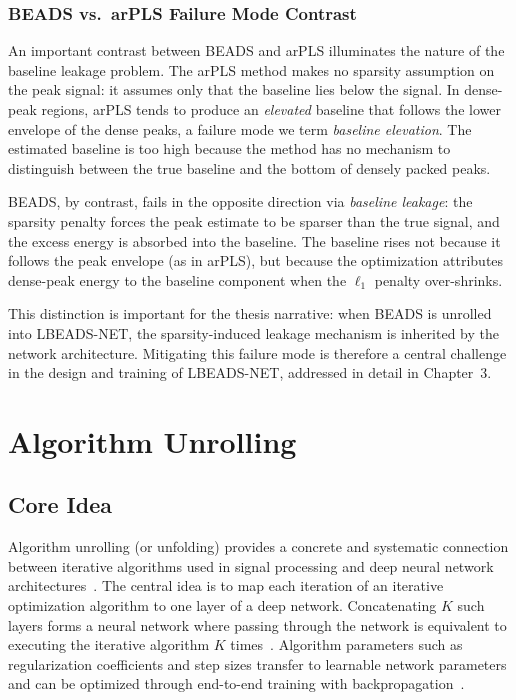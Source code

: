 \subsubsection{BEADS vs.\ arPLS Failure Mode Contrast}

An important contrast between BEADS and arPLS illuminates the nature of the baseline leakage problem. The arPLS method makes no sparsity assumption on the peak signal: it assumes only that the baseline lies below the signal. In dense-peak regions, arPLS tends to produce an \emph{elevated} baseline that follows the lower envelope of the dense peaks, a failure mode we term \emph{baseline elevation}. The estimated baseline is too high because the method has no mechanism to distinguish between the true baseline and the bottom of densely packed peaks.

BEADS, by contrast, fails in the opposite direction via \emph{baseline leakage}: the sparsity penalty forces the peak estimate to be sparser than the true signal, and the excess energy is absorbed into the baseline. The baseline rises not because it follows the peak envelope (as in arPLS), but because the optimization attributes dense-peak energy to the baseline component when the $\ell_1$ penalty over-shrinks.

This distinction is important for the thesis narrative: when BEADS is unrolled into LBEADS-NET, the sparsity-induced leakage mechanism is inherited by the network architecture. Mitigating this failure mode is therefore a central challenge in the design and training of LBEADS-NET, addressed in detail in Chapter~3.


\section{Algorithm Unrolling}
\label{sec:bg_unrolling}

\subsection{Core Idea}

Algorithm unrolling (or unfolding) provides a concrete and systematic connection between iterative algorithms used in signal processing and deep neural network architectures~\cite{monga2021unrolling}. The central idea is to map each iteration of an iterative optimization algorithm to one layer of a deep network. Concatenating $K$ such layers forms a neural network where passing through the network is equivalent to executing the iterative algorithm $K$ times~\cite{monga2021unrolling}. Algorithm parameters such as regularization coefficients and step sizes transfer to learnable network parameters and can be optimized through end-to-end training with backpropagation~\cite{monga2021unrolling}.

